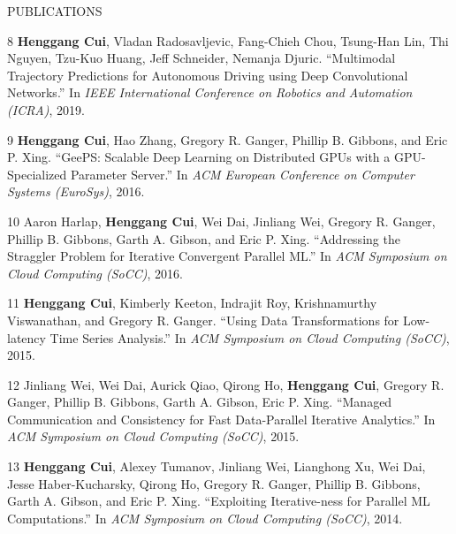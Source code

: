 \documentclass{resume} %
\begin{document}
\begin{rSection}{PUBLICATIONS}
{    \item
    [8]
        {\bf Henggang Cui}, Vladan Radosavljevic, Fang-Chieh Chou, Tsung-Han Lin, Thi Nguyen, Tzu-Kuo Huang, Jeff Schneider, Nemanja Djuric.
        ``Multimodal Trajectory Predictions for Autonomous Driving using Deep Convolutional Networks.''
        In \emph{IEEE International Conference on Robotics and Automation (ICRA)}, 2019.
    \item
    [9]
        {\bf Henggang Cui}, Hao Zhang, Gregory R. Ganger, Phillip B. Gibbons, and Eric P. Xing.
        ``GeePS: Scalable Deep Learning on Distributed GPUs with a GPU-Specialized Parameter Server.''
        In \emph{ACM European Conference on Computer Systems (EuroSys)}, 2016.
    \item
    [10]
        Aaron Harlap, {\bf Henggang Cui}, Wei Dai, Jinliang Wei, Gregory R. Ganger, Phillip B. Gibbons, Garth A. Gibson, and Eric P. Xing.
        ``Addressing the Straggler Problem for Iterative Convergent Parallel ML.''
        In \emph{ACM Symposium on Cloud Computing (SoCC)}, 2016.
    \item
    [11]
        {\bf Henggang Cui}, Kimberly Keeton, Indrajit Roy, Krishnamurthy Viswanathan, and Gregory R. Ganger.
        ``Using Data Transformations for Low-latency Time Series Analysis.''
        In \emph{ACM Symposium on Cloud Computing (SoCC)}, 2015.
    \item
    [12]
        Jinliang Wei, Wei Dai, Aurick Qiao, Qirong Ho, {\bf Henggang Cui}, Gregory R. Ganger, Phillip B. Gibbons, Garth A. Gibson, Eric P. Xing.
        ``Managed Communication and Consistency for Fast Data-Parallel Iterative Analytics.''
        In \emph{ACM Symposium on Cloud Computing (SoCC)}, 2015.
    \item
    [13]
        {\bf Henggang Cui}, Alexey Tumanov, Jinliang Wei, Lianghong Xu, Wei Dai, Jesse Haber-Kucharsky, Qirong Ho, Gregory R. Ganger, Phillip B. Gibbons, Garth A. Gibson, and Eric P. Xing.
        ``Exploiting Iterative-ness for Parallel ML Computations.''
        In \emph{ACM Symposium on Cloud Computing (SoCC)}, 2014.
}
\end{rSection}
\end{document}
